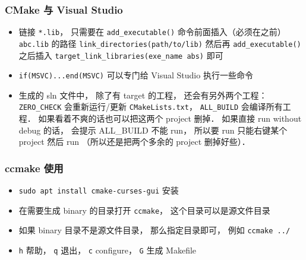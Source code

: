\subsubsection{CMake 与 Visual Studio}
\begin{itemize}
\item 链接 \verb`*.lib`， 只需要在 \verb`add_executable()` 命令前面插入（必须在之前） \verb`abc.lib` 的路径 \verb`link_directories(path/to/lib)` 然后再 \verb`add_executable()` 之后插入 \verb`target_link_libraries(exe_name abs)` 即可
\item \verb`if(MSVC)...end(MSVC)` 可以专门给 Visual Studio 执行一些命令
\item 生成的 sln 文件中， 除了有 target 的工程， 还会有另外两个工程： \verb`ZERO_CHECK` 会重新运行/更新 \verb`CMakeLists.txt`， \verb`ALL_BUILD` 会编译所有工程． 如果看着不爽的话也可以把这两个 project 删掉． 如果直接 run without debug 的话， 会提示 ALL_BUILD 不能 run， 所以要 run 只能右键某个 project 然后 run （所以还是把两个多余的 project 删掉好些）．
\end{itemize}

\subsubsection{ccmake 使用}
\begin{itemize}
\item \verb`sudo apt install cmake-curses-gui` 安装
\item 在需要生成 binary 的目录打开 \verb`ccmake`， 这个目录可以是源文件目录
\item 如果 binary 目录不是源文件目录， 那么指定目录即可， 例如 \verb`ccmake ../`
\item \verb`h` 帮助， \verb`q` 退出， \verb`c` configure， \verb`G` 生成 Makefile
\end{itemize}
